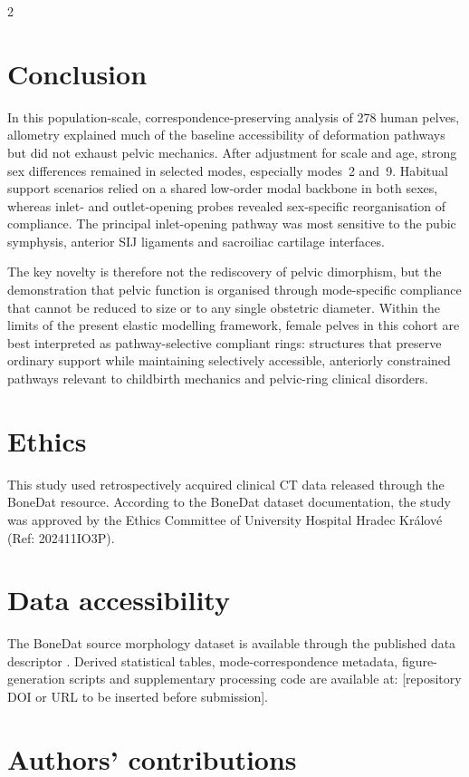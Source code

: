 \documentclass[openacc]{rsproca_new}
\begin{document}
\begin{multicols}{2}
\section{Conclusion}

In this population-scale, correspondence-preserving analysis of 278 human pelves, allometry explained much of the baseline accessibility of deformation pathways but did not exhaust pelvic mechanics. After adjustment for scale and age, strong sex differences remained in selected modes, especially modes~2 and~9. Habitual support scenarios relied on a shared low-order modal backbone in both sexes, whereas inlet- and outlet-opening probes revealed sex-specific reorganisation of compliance. The principal inlet-opening pathway was most sensitive to the pubic symphysis, anterior SIJ ligaments and sacroiliac cartilage interfaces.

The key novelty is therefore not the rediscovery of pelvic dimorphism, but the demonstration that pelvic function is organised through mode-specific compliance that cannot be reduced to size or to any single obstetric diameter. Within the limits of the present elastic modelling framework, female pelves in this cohort are best interpreted as pathway-selective compliant rings: structures that preserve ordinary support while maintaining selectively accessible, anteriorly constrained pathways relevant to childbirth mechanics and pelvic-ring clinical disorders.

\section*{Ethics}

This study used retrospectively acquired clinical CT data released through the BoneDat resource. According to the BoneDat dataset documentation, the study was approved by the Ethics Committee of University Hospital Hradec Kr\'{a}lov\'{e} (Ref: 202411IO3P).

\section*{Data accessibility}

The BoneDat source morphology dataset is available through the published data descriptor \cite{HenysKuchar2025}. Derived statistical tables, mode-correspondence metadata, figure-generation scripts and supplementary processing code are available at: [repository DOI or URL to be inserted before submission].

\section*{Authors' contributions}


\end{multicols}
\end{document}
